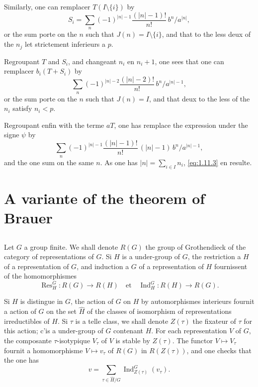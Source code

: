 \documentclass[12pt,a4paper]{article}
\theoremstyle{plain}
\theoremstyle{definition}
\theoremstyle{remark}
\DeclareMathOperator{\Ind}{Ind}
\DeclareMathOperator{\Res}{Res}
\begin{document}
Similarly, one can remplacer $T(I \setminus \{i\})$ by
\[
S_i = \sum_n (-1)^{|n|-1} \frac{(|n|-1)!}{n!} \, b^n/a^{|n|},
\]
or the sum porte on the $n$ such that $J(n) = I \setminus \{i\}$, and that to the less deux of the $n_j$ let strictement inferieurs a $p$.

Regroupant $T$ and $S_i$, and changeant $n_i$ en $n_i + 1$, one sees that one can remplacer $b_i(T + S_i)$ by
\[
\sum_n (-1)^{|n|-2} \frac{(|n|-2)!}{n!} \, b^n/a^{|n|-1},
\]
or the sum porte on the $n$ such that $J(n) = I$, and that deux to the less of the $n_i$ satisfy $n_i < p$.

Regroupant enfin with the terme $aT$, one has remplace the expression under the signe $\psi$ by
\[
\sum_n (-1)^{|n|-1} \frac{(|n|-1)!}{n!} \, (|n|-1) \, b^n/a^{|n|-1},
\]
and the one sum on the same $n$. As one has $|n| = \sum_{i \in I} n_i$, \eqref{eq:1.11.3} en resulte.


\section{A variante of the theorem of Brauer}
\label{sec:2}

\subsection{}
\label{sec:2.1}

Let $G$ a group finite. We shall denote $R(G)$ the group of Grothendieck of the category of representations of $G$. Si $H$ is a under-group of $G$, the restriction a $H$ of a representation of $G$, and induction a $G$ of a representation of $H$ fournissent of the homomorphismes
\[
\Res_H^G: R(G) \to R(H) \quad \text{et} \quad \Ind_H^G: R(H) \to R(G).
\]

Si $H$ is distingue in $G$, the action of $G$ on $H$ by automorphismes interieurs fournit a action of $G$ on the set $\hat{H}$ of the classes of isomorphism of representations irreductibles of $H$. Si $\tau$ is a telle class, we shall denote $Z(\tau)$ the fixateur of $\tau$ for this action; c'is a under-group of $G$ contenant $H$. For each representation $V$ of $G$, the composante $\tau$-isotypique $V_\tau$ of $V$ is stable by $Z(\tau)$. The functor $V \mapsto V_\tau$ fournit a homomorphisme $V \mapsto v_\tau$ of $R(G)$ in $R(Z(\tau))$, and one checks that the one has
\begin{equation}\label{eq:2.1.1}
v = \sum_{\tau \in \hat{H}/G} \Ind_{Z(\tau)}^G(v_\tau).
\end{equation}
\end{document}
